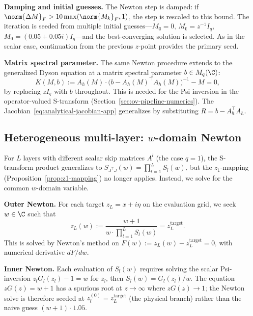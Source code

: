 \medskip
\noindent\textbf{Damping and initial guesses.}
The Newton step is damped: if $\norm{\Delta M}_F > 10 \max(\norm{M_k}_F, 1)$, the step is rescaled to this bound. The iteration is seeded from multiple initial guesses---$M_0 = 0$, $M_0 = z^{-1}I_q$, $M_0 = (0.05 + 0.05i)I_q$---and the best-converging solution is selected. As in the scalar case, continuation from the previous $z$-point provides the primary seed.\label{rem:branch}

\medskip
\noindent\textbf{Matrix spectral parameter.}
The same Newton procedure extends to the generalized Dyson equation at a matrix spectral parameter $b \in M_q(\C)$:
\begin{equation}\label{eq:dyson-matrix-arg}
K(M, b) := A_h(M) \cdot \bigl(b - A_h(M)^\top A_h(M)\bigr)^{-1} - M = 0,
\end{equation}
by replacing $zI_q$ with $b$ throughout. This is needed for the Psi-inversion in the operator-valued S-transform (Section~\ref{sec:ov-pipeline-numerics}). The Jacobian~\eqref{eq:analytical-jacobian-app} generalizes by substituting $R = b - A_h^\top A_h$.

\subsection{Heterogeneous multi-layer: $w$-domain Newton}\label{app:w-domain}

For $L$ layers with different scalar skip matrices $A^l$ (the case $q = 1$), the S-transform product generalizes to $S_{J^\top J}(w) = \prod_{l=1}^L S_l(w)$, but the $z_1$-mapping (Proposition~\ref{prop:z1-mapping}) no longer applies. Instead, we solve for the common $w$-domain variable.

\medskip
\noindent\textbf{Outer Newton.}
For each target $z_L = x + i\eta$ on the evaluation grid, we seek $w \in \C$ such that
\begin{equation}\label{eq:w-domain-outer-app}
z_L(w) := \frac{w + 1}{w \cdot \prod_{l=1}^L S_l(w)} = z_L^{\mathrm{target}}.
\end{equation}
This is solved by Newton's method on $F(w) := z_L(w) - z_L^{\mathrm{target}} = 0$, with numerical derivative $dF/dw$.

\medskip
\noindent\textbf{Inner Newton.}
Each evaluation of $S_l(w)$ requires solving the scalar Psi-inversion $z_l G_l(z_l) - 1 = w$ for $z_l$, then $S_l(w) = G_l(z_l)/w$. The equation $z G(z) = w + 1$ has a spurious root at $z \to \infty$ where $zG(z) \to 1$; the Newton solve is therefore seeded at $z_l^{(0)} = z_L^{\mathrm{target}}$ (the physical branch) rather than the naive guess $(w+1) \cdot 1.05$.

